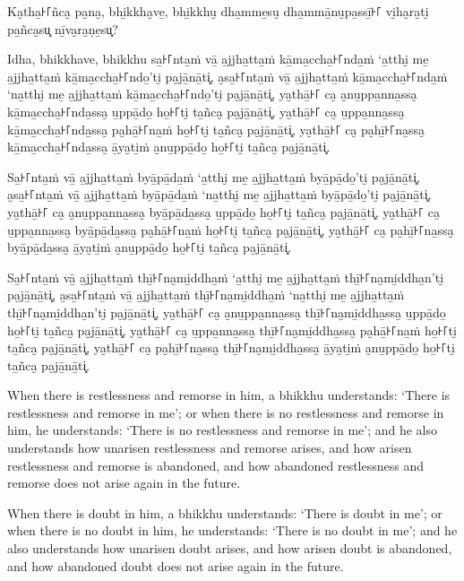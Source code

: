 Ka̮tha̱꜔꜒ñca̮ pa̮na̮, bhi̱kkha̮ve̱, bhi̱kkhu̮ dha̱mme̱su̮ dha̱mmā̱nu̮pa̱ssī̱꜔꜒ vi̮ha̮ra̮ti̮ pa̱ñca̮su͓
nī̱va̮ra̮ṇe̱su͓?

Idha, bhikkhave, bhikkhu
sa̱꜔꜒nta̱ṁ vā̱ a̱jjha̱tta̱ṁ kā̱ma̱ccha̱꜔꜒nda̱ṁ ‘a̱tthi̮ me̱ a̱jjha̱tta̱ṁ kā̱ma̱ccha̱꜔꜒ndo̱’ti̮ pa̮jā̱nā̱ti͓,
a̮sa̱꜔꜒nta̱ṁ vā̱ a̱jjha̱tta̱ṁ kā̱ma̱ccha̱꜔꜒nda̱ṁ ‘na̱tthi̮ me̱ a̱jjha̱tta̱ṁ kā̱ma̱ccha̱꜔꜒ndo̱’ti̮ pa̮jā̱nā̱ti͓,
ya̮thā̱꜔꜒ ca̮ a̮nu̱ppa̱nna̱ssa̮ kā̱ma̱ccha̱꜔꜒nda̱ssa̮ u̱ppā̱do̱ ho̱꜔꜒ti̮ ta̱ñca̮ pa̮jā̱nā̱ti͓,
ya̮thā̱꜔꜒ ca̮ u̱ppa̱nna̱ssa̮ kā̱ma̱ccha̱꜔꜒nda̱ssa̮ pa̮hā̱꜔꜒na̱ṁ ho̱꜔꜒ti̮ ta̱ñca̮ pa̮jā̱nā̱ti͓,
ya̮thā̱꜔꜒ ca̮ pa̮hī̱꜔꜒na̱ssa̮ kā̱ma̱ccha̱꜔꜒nda̱ssa̮ ā̱ya̮ti̱ṁ a̮nu̱ppā̱do̱ ho̱꜔꜒ti̮ ta̱ñca̮ pa̮jā̱nā̱ti͓.

Sa̱꜔꜒nta̱ṁ vā̱ a̱jjha̱tta̱ṁ byā̱pā̱da̱ṁ ‘a̱tthi̮ me̱ a̱jjha̱tta̱ṁ byā̱pā̱do̱’ti̮ pa̮jā̱nā̱ti͓,
a̮sa̱꜔꜒nta̱ṁ vā̱ a̱jjha̱tta̱ṁ byā̱pā̱da̱ṁ ‘na̱tthi̮ me̱ a̱jjha̱tta̱ṁ byā̱pā̱do̱’ti̮ pa̮jā̱nā̱ti͓,
ya̮thā̱꜔꜒ ca̮ a̮nu̱ppa̱nna̱ssa̮ byā̱pā̱da̱ssa̮ u̱ppā̱do̱ ho̱꜔꜒ti̮ ta̱ñca̮ pa̮jā̱nā̱ti͓,
ya̮thā̱꜔꜒ ca̮ u̱ppa̱nna̱ssa̮ byā̱pā̱da̱ssa̮ pa̮hā̱꜔꜒na̱ṁ ho̱꜔꜒ti̮ ta̱ñca̮ pa̮jā̱nā̱ti͓,
ya̮thā̱꜔꜒ ca̮ pa̮hī̱꜔꜒na̱ssa̮ byā̱pā̱da̱ssa̮ ā̱ya̮ti̱ṁ a̮nu̱ppā̱do̱ ho̱꜔꜒ti̮ ta̱ñca̮ pa̮jā̱nā̱ti͓.

\enlargethispage{\baselineskip}

Sa̱꜔꜒nta̱ṁ vā̱ a̱jjha̱tta̱ṁ thī̱꜔꜒na̮mi̱ddha̱ṁ ‘a̱tthi̮ me̱ a̱jjha̱tta̱ṁ thī̱꜔꜒na̮mi̱ddha̱n’ti̮ pa̮jā̱nā̱ti͓,
a̮sa̱꜔꜒nta̱ṁ vā̱ a̱jjha̱tta̱ṁ thī̱꜔꜒na̮mi̱ddha̱ṁ ‘na̱tthi̮ me̱ a̱jjha̱tta̱ṁ thī̱꜔꜒na̮mi̱ddha̱n’ti̮ pa̮jā̱nā̱ti͓,
ya̮thā̱꜔꜒ ca̮ a̮nu̱ppa̱nna̱ssa̮ thī̱꜔꜒na̮mi̱ddha̱ssa̮ u̱ppā̱do̱ ho̱꜔꜒ti̮ ta̱ñca̮ pa̮jā̱nā̱ti͓,
ya̮thā̱꜔꜒ ca̮ u̱ppa̱nna̱ssa̮ thī̱꜔꜒na̮mi̱ddha̱ssa̮ pa̮hā̱꜔꜒na̱ṁ ho̱꜔꜒ti̮ ta̱ñca̮ pa̮jā̱nā̱ti͓,
ya̮thā̱꜔꜒ ca̮ pa̮hī̱꜔꜒na̱ssa̮ thī̱꜔꜒na̮mi̱ddha̱ssa̮ ā̱ya̮ti̱ṁ a̮nu̱ppā̱do̱ ho̱꜔꜒ti̮ ta̱ñca̮ pa̮jā̱nā̱ti͓.

\englishPage

When there is restlessness and remorse in him, a bhikkhu understands:
`There is restlessness and remorse in me';
or when there is no restlessness and remorse in him, he understands:
`There is no restlessness and remorse in me';
and he also understands how unarisen restlessness and remorse arises,
and how arisen restlessness and remorse is abandoned,
and how abandoned restlessness and remorse does not arise again in the future.

When there is doubt in him, a bhikkhu understands:
`There is doubt in me';
or when there is no doubt in him, he understands:
`There is no doubt in me';
and he also understands how unarisen doubt arises,
and how arisen doubt is abandoned,
and how abandoned doubt does not arise again in the future.

